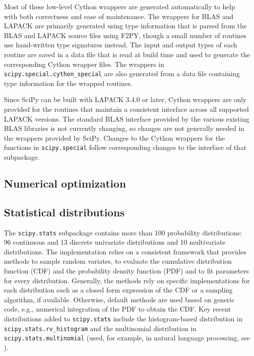 \documentclass[fleqn,10pt]{wlscirep}
\begin{document}
Most of these low-level Cython wrappers are generated automatically to help
with both correctness and ease of maintenance.  The wrappers for BLAS and
LAPACK are primarily generated using type information that is parsed from the
BLAS and LAPACK source files using F2PY\cite{peterson2009f2py}, though a small
number of routines use hand-written type signatures instead.  The input and
output types of each routine are saved in a data file that is read at build
time and used to generate the corresponding Cython wrapper files.  The wrappers
in \texttt{scipy.{\allowbreak}special.{\allowbreak}cython\_special} are also
generated from a data file containing type information for the wrapped
routines.

Since SciPy can be built with LAPACK 3.4.0 or later, Cython wrappers are only
provided for the routines that maintain a consistent interface across all
supported LAPACK versions.  The standard BLAS interface provided by the various
existing BLAS libraries is not currently changing, so changes are not generally
needed in the wrappers provided by SciPy.  Changes to the Cython wrappers for
the functions in \texttt{scipy.{\allowbreak}special} follow corresponding
changes to the interface of that subpackage.

\subsection*{Numerical optimization}



\subsection*{Statistical distributions}

The \texttt{scipy.stats} subpackage contains more than 100 probability
distributions: 96 continuous and 13 discrete univariate distributions
and 10 multivariate distributions. The implementation relies on a
consistent framework that provides methods to sample random variates,
to evaluate the cumulative distribution function (CDF) and the probability
density function (PDF) and to fit parameters for every distribution.
Generally, the methods rely on specific implementations for each
distribution such as a closed form expression of the CDF or a sampling
algorithm, if available. Otherwise, default methods are used
based on generic code, e.g., numerical integration of the PDF to
obtain the CDF.
Key recent distributions added to \texttt{scipy.stats} include the
histogram-based distribution in \texttt{scipy.stats.rv\_histogram}
and the multinomial distribution in \texttt{scipy.stats.multinomial}
(used, for example, in natural language processing, see
\cite{Griffiths5228}).
\end{document}
